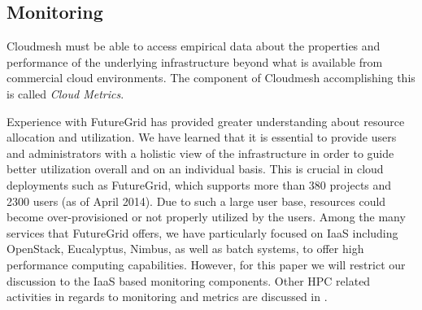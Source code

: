 \documentclass{tex/sig-alternate-2013}
\begin{document}
\subsection{Monitoring}

Cloudmesh must be able to access empirical data about the properties
and performance of the underlying infrastructure beyond what is
available from commercial cloud environments. The component of
Cloudmesh accomplishing this is called {\em Cloud Metrics}.

Experience with FutureGrid has provided greater understanding about
resource allocation and utilization. We have learned that it is
essential to provide users and administrators with a holistic view of
the infrastructure in order to guide better utilization overall and on
an individual basis. This is crucial in cloud deployments such as
FutureGrid, which supports more than 380 projects and 2300 users (as
of April 2014). Due to such a large user base, resources could become
over-provisioned or not properly utilized by the users. Among the many
services that FutureGrid offers, we have particularly
focused on IaaS including OpenStack, Eucalyptus, Nimbus, as well as
batch systems, to offer high performance computing capabilities.
However, for this paper we will restrict our discussion to the IaaS
based monitoring components.  Other HPC related activities in regards
to monitoring and metrics are discussed in \cite{las13xdmod}.
\end{document}
